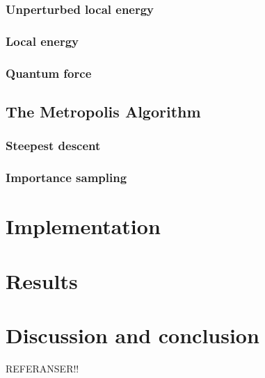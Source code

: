\documentclass[11pt]{article}
\newcommand{\husk}[1]{\color{red} #1 \color{black}}
\begin{document}
\subsubsection{Unperturbed local energy}

\subsubsection{Local energy}

\subsubsection{Quantum force}




\subsection{The Metropolis Algorithm}

\subsubsection{Steepest descent}

\subsubsection{Importance sampling}



\section{Implementation}



\section{Results}



\section{Discussion and conclusion}


\husk{REFERANSER!!}
\end{document}
